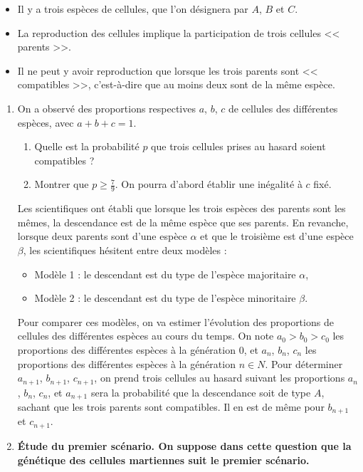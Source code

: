 \documentclass[landscape,twocolumn,leqno,a4paper,10pt]{report} %
\renewcommand{\geq}{\geqslant}
\renewcommand{\textbf}[1]{\begingroup\bfseries\mathversion{bold}#1\endgroup}		%
\begin{document}
\begin{itemize}
	\item Il y a trois espèces de cellules, que l'on désignera par $A$, $B$ et $C$.
	\item La reproduction des cellules implique la participation de trois cellules << parents >>.
	\item Il ne peut y avoir reproduction que lorsque les trois parents sont << compatibles >>, c'est-à-dire que au moins deux sont de la même espèce.
\end{itemize}
\begin{enumerate}
	\item On a observé des proportions respectives $a$, $b$, $c$ de cellules des différentes espèces, avec $a+b+c=1$.
	\begin{enumerate}
		\item Quelle est la probabilité $p$ que trois cellules prises au hasard soient compatibles ?
		\item Montrer que $p \geq \frac{7}{9}$. On pourra d'abord établir une inégalité à $c$ fixé.
	\end{enumerate}
	Les scientifiques ont établi que lorsque les trois espèces des parents sont les mêmes, la descendance est de la même espèce que ses parents. En revanche, lorsque deux parents sont d'une espèce $\alpha$ et que le troisième est d'une espèce $\beta$, les scientifiques hésitent entre deux modèles :
	\begin{itemize}
		\item Modèle 1 : le descendant est du type de l'espèce majoritaire $\alpha$,
		\item Modèle 2 : le descendant est du type de l'espèce minoritaire $\beta$.
	\end{itemize}
	Pour comparer ces modèles, on va estimer l'évolution des proportions de cellules des différentes espèces au cours du temps. On note $a_{0}>b_{0}>c_{0}$ les proportions des différentes espèces à la génération 0, et $a_{n}$, $b_{n}$, $c_{n}$ les proportions des différentes espèces à la génération $n \in N$. Pour déterminer $a_{n+1}$, $b_{n+1}$, $c_{n+1}$, on prend trois cellules au hasard suivant les proportions $a_{n}$, $b_{n}$, $c_{n}$, et $a_{n+1}$ sera la probabilité que la descendance soit de type $A$, sachant que les trois parents sont compatibles. Il en est de même pour $b_{n+1}$ et $c_{n+1}$.
	\item \textbf{Étude du premier scénario.} On suppose dans cette question que la génétique des cellules martiennes suit le premier scénario.
	\begin{enumerate}

\end{enumerate}
\end{enumerate}
\end{document}
